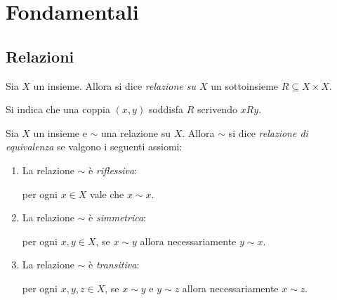 \chapter{Fondamentali}

\section{Relazioni}

\begin{definition}
    Sia $X$ un insieme. Allora si dice \emph{relazione su $X$} un sottoinsieme $R \subseteq X \times X$. 
    
    Si indica che una coppia $(x, y)$ soddisfa $R$ scrivendo $xRy$. 
\end{definition}

\begin{definition}
    Sia $X$ un insieme e $\sim$ una relazione su $X$. Allora $\sim$ si dice \emph{relazione di equivalenza} se valgono i seguenti assiomi: \begin{enumerate}[label={(EQ\arabic*)}]
        \item La relazione $\sim$ è \emph{riflessiva}:
        
        per ogni $x \in X$ vale che $x \sim x$.
        \item La relazione $\sim$ è \emph{simmetrica}:
        
        per ogni $x, y \in X$, se $x \sim y$ allora necessariamente $y \sim x$.
        \item La relazione $\sim$ è \emph{transitiva}:
        
        per ogni $x, y, z \in X$, se $x \sim y$ e $y \sim z$ allora necessariamente $x \sim z$.
    \end{enumerate}
\end{definition}

